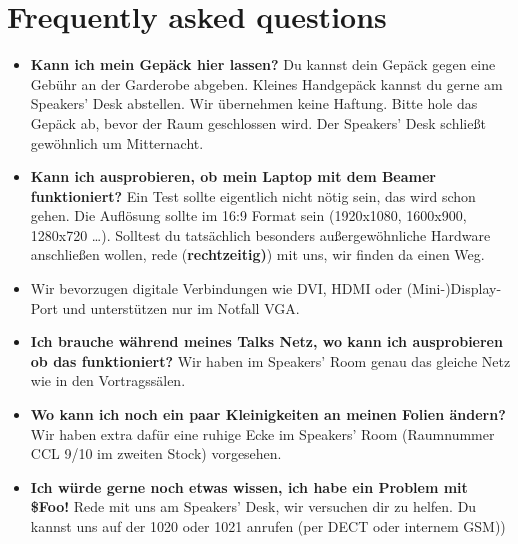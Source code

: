 \documentclass[paper=a4]{scrartcl}
\begin{document}
\section*{Frequently asked questions}
\begin{itemize}
	\item \textbf{Kann ich mein Gepäck hier lassen?} Du kannst dein Gepäck gegen eine Gebühr an der Garderobe abgeben. Kleines Handgepäck kannst du gerne am Speakers' Desk abstellen. Wir übernehmen keine Haftung. Bitte hole das Gepäck ab, bevor der Raum geschlossen wird. Der Speakers' Desk schließt gewöhnlich um Mitternacht.
	\item \textbf{Kann ich ausprobieren, ob mein Laptop mit dem Beamer funktioniert?} Ein Test sollte eigentlich nicht nötig sein, das wird schon gehen. Die Auflösung sollte im 16:9 Format sein (1920x1080, 1600x900, 1280x720 \ldots). Solltest du tatsächlich besonders außergewöhnliche Hardware anschließen wollen, rede (\textbf{rechtzeitig)}) mit uns, wir finden da einen Weg.
	\item Wir bevorzugen digitale Verbindungen wie DVI, HDMI oder (Mini-)Display-Port und unterstützen nur im Notfall VGA.
	\item \textbf{Ich brauche während meines Talks Netz, wo kann ich ausprobieren ob das funktioniert?} Wir haben im Speakers' Room genau das gleiche Netz wie in den Vortragssälen.
	\item \textbf{Wo kann ich noch ein paar Kleinigkeiten an meinen Folien ändern?}
	 Wir haben extra dafür eine ruhige Ecke im Speakers' Room (Raumnummer CCL 9/10 im zweiten Stock) vorgesehen.
	\item \textbf{Ich würde gerne noch etwas wissen, ich habe ein Problem mit \$Foo!} Rede mit uns am Speakers' Desk, wir versuchen dir zu helfen. Du kannst uns auf der 1020 oder 1021 anrufen (per DECT oder internem GSM))
\end{itemize}
\end{document}
